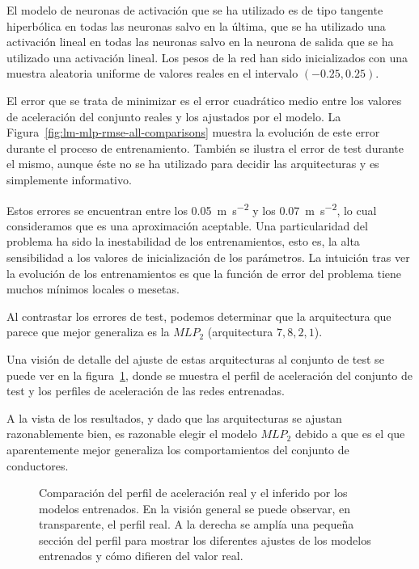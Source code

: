 El modelo de neuronas de activación que se ha utilizado es de tipo tangente hiperbólica en todas las neuronas salvo en la última, que se ha utilizado una activación lineal en todas las neuronas salvo en la neurona de salida que se ha utilizado una activación lineal. Los pesos de la red han sido inicializados con una muestra aleatoria uniforme de valores reales en el intervalo $(-0.25, 0.25)$.

El error que se trata de minimizar es el error cuadrático medio entre los valores de aceleración del conjunto reales y los ajustados por el modelo. La Figura~\ref{fig:lm-mlp-rmse-all-comparisons} muestra la evolución de este error durante el proceso de entrenamiento. También se ilustra el error de test durante el mismo, aunque éste no se ha utilizado para decidir las arquitecturas y es simplemente informativo.

Estos errores se encuentran entre los \SI{0.05}{\metre\per\square\second} y los \SI{0.07}{\metre\per\square\second}, lo cual consideramos que es una aproximación aceptable. Una particularidad del problema ha sido la inestabilidad de los entrenamientos, esto es, la alta sensibilidad a los valores de inicialización de los parámetros. La intuición tras ver la evolución de los entrenamientos es que la función de error del problema tiene muchos mínimos locales o mesetas.

Al contrastar los errores de test, podemos determinar que la arquitectura que parece que mejor generaliza es la $MLP_2$ (arquitectura $7, 8, 2, 1$).

Una visión de detalle del ajuste de estas arquitecturas al conjunto de test se puede ver en la figura~\ref{fig:cf-mlp-test-comparisons}, donde se muestra el perfil de aceleración del conjunto de test y los perfiles de aceleración de las redes entrenadas.

A la vista de los resultados, y dado que las arquitecturas se ajustan razonablemente bien, es razonable elegir el modelo $MLP_2$ debido a que es el que aparentemente mejor generaliza los comportamientos del conjunto de conductores.

\begin{figure}[t]
	\centering
	\qquad
	\caption[Comparación del perfil de aceleración real y el inferido por los modelos entrenados]{Comparación del perfil de aceleración real y el inferido por los modelos entrenados. En la visión general se puede observar, en transparente, el perfil real. A la derecha se amplía una pequeña sección del perfil para mostrar los diferentes ajustes de los modelos entrenados y cómo difieren del valor real.}
	\label{fig:cf-mlp-test-comparisons}
\end{figure}

